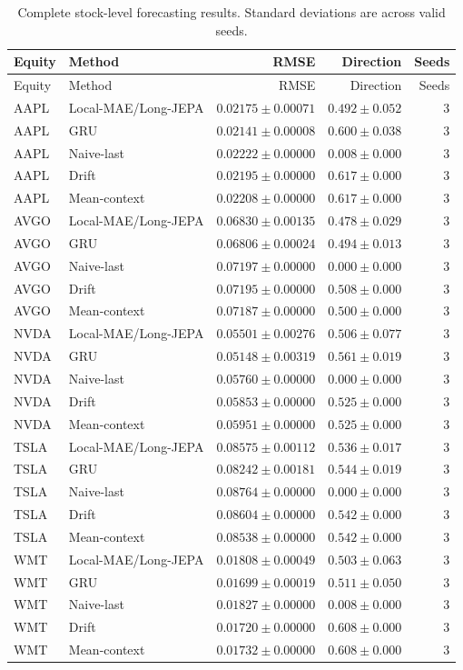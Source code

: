 \begin{longtable}{llrrr}
\caption{Complete stock-level forecasting results. Standard deviations are across valid seeds.}\label{tab:appendix_stock_metrics}\\
\toprule
Equity & Method & RMSE & Direction & Seeds \\
\midrule
\endfirsthead
\toprule
Equity & Method & RMSE & Direction & Seeds \\
\midrule
\endhead
AAPL & Local-MAE/Long-JEPA & $0.02175 \pm 0.00071$ & $0.492 \pm 0.052$ & 3 \\
AAPL & GRU & $0.02141 \pm 0.00008$ & $0.600 \pm 0.038$ & 3 \\
AAPL & Naive-last & $0.02222 \pm 0.00000$ & $0.008 \pm 0.000$ & 3 \\
AAPL & Drift & $0.02195 \pm 0.00000$ & $0.617 \pm 0.000$ & 3 \\
AAPL & Mean-context & $0.02208 \pm 0.00000$ & $0.617 \pm 0.000$ & 3 \\
AVGO & Local-MAE/Long-JEPA & $0.06830 \pm 0.00135$ & $0.478 \pm 0.029$ & 3 \\
AVGO & GRU & $0.06806 \pm 0.00024$ & $0.494 \pm 0.013$ & 3 \\
AVGO & Naive-last & $0.07197 \pm 0.00000$ & $0.000 \pm 0.000$ & 3 \\
AVGO & Drift & $0.07195 \pm 0.00000$ & $0.508 \pm 0.000$ & 3 \\
AVGO & Mean-context & $0.07187 \pm 0.00000$ & $0.500 \pm 0.000$ & 3 \\
NVDA & Local-MAE/Long-JEPA & $0.05501 \pm 0.00276$ & $0.506 \pm 0.077$ & 3 \\
NVDA & GRU & $0.05148 \pm 0.00319$ & $0.561 \pm 0.019$ & 3 \\
NVDA & Naive-last & $0.05760 \pm 0.00000$ & $0.000 \pm 0.000$ & 3 \\
NVDA & Drift & $0.05853 \pm 0.00000$ & $0.525 \pm 0.000$ & 3 \\
NVDA & Mean-context & $0.05951 \pm 0.00000$ & $0.525 \pm 0.000$ & 3 \\
TSLA & Local-MAE/Long-JEPA & $0.08575 \pm 0.00112$ & $0.536 \pm 0.017$ & 3 \\
TSLA & GRU & $0.08242 \pm 0.00181$ & $0.544 \pm 0.019$ & 3 \\
TSLA & Naive-last & $0.08764 \pm 0.00000$ & $0.000 \pm 0.000$ & 3 \\
TSLA & Drift & $0.08604 \pm 0.00000$ & $0.542 \pm 0.000$ & 3 \\
TSLA & Mean-context & $0.08538 \pm 0.00000$ & $0.542 \pm 0.000$ & 3 \\
WMT & Local-MAE/Long-JEPA & $0.01808 \pm 0.00049$ & $0.503 \pm 0.063$ & 3 \\
WMT & GRU & $0.01699 \pm 0.00019$ & $0.511 \pm 0.050$ & 3 \\
WMT & Naive-last & $0.01827 \pm 0.00000$ & $0.008 \pm 0.000$ & 3 \\
WMT & Drift & $0.01720 \pm 0.00000$ & $0.608 \pm 0.000$ & 3 \\
WMT & Mean-context & $0.01732 \pm 0.00000$ & $0.608 \pm 0.000$ & 3 \\
\bottomrule
\end{longtable}
